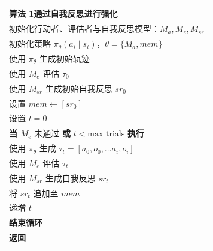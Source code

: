 \begingroup
\small
\renewcommand{\arraystretch}{1.25}
\begin{minipage}{.94\linewidth}
\begin{tabularx}{\linewidth}{@{}X@{}}
\toprule
\textbf{算法 1}\quad 通过自我反思进行强化 \\
\midrule
初始化行动者、评估者与自我反思模型：$M_a,M_e,M_{sr}$ \\
初始化策略 $\pi_\theta(a_i\mid s_i)$，$\theta=\{M_a,mem\}$ \\
使用 $\pi_\theta$ 生成初始轨迹 \\
使用 $M_e$ 评估 $\tau_0$ \\
使用 $M_{sr}$ 生成初始自我反思 $sr_0$ \\
设置 $mem\leftarrow[sr_0]$ \\
设置 $t=0$ \\
\textbf{当} $M_e$ 未通过 \textbf{或} $t<\text{max trials}$ \textbf{执行} \\
\hspace*{1.5em}使用 $\pi_\theta$ 生成 $\tau_t=[a_0,o_0,\ldots a_i,o_i]$ \\
\hspace*{1.5em}使用 $M_e$ 评估 $\tau_t$ \\
\hspace*{1.5em}使用 $M_{sr}$ 生成自我反思 $sr_t$ \\
\hspace*{1.5em}将 $sr_t$ 追加至 $mem$ \\
\hspace*{1.5em}递增 $t$ \\
\textbf{结束循环} \\
\textbf{返回} \\
\bottomrule
\end{tabularx}
\end{minipage}
\endgroup
